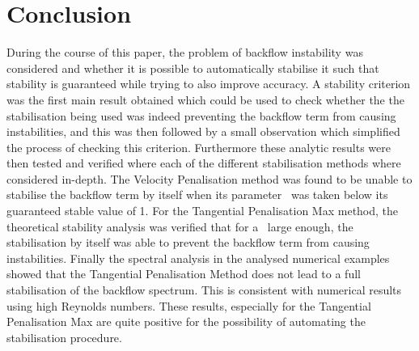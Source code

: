 
\section{Conclusion}
During the course of this paper, the problem of backflow instability was considered and whether it is possible to automatically stabilise it such that stability is guaranteed while trying to also improve accuracy. A stability criterion was the first main result obtained which could be used to check whether the the stabilisation being used was indeed preventing the backflow term from causing instabilities, and this was then followed by a small observation which simplified the process of checking this criterion. Furthermore these analytic results were then tested and verified where each of the different stabilisation methods where considered in-depth. The Velocity Penalisation method was found to be unable to stabilise the backflow term by itself when its parameter \mbeta~was taken below its guaranteed stable value of 1. For the Tangential Penalisation Max method, the theoretical stability analysis was verified that for a \mgamma~large enough, the stabilisation by itself was able to prevent the backflow term from causing instabilities. Finally the spectral analysis in the analysed numerical examples showed that the Tangential Penalisation Method does not lead to a full stabilisation of the backflow spectrum. This is consistent with numerical results using high Reynolds numbers. These results, especially for the Tangential Penalisation Max are quite positive for the possibility of automating the stabilisation procedure.

